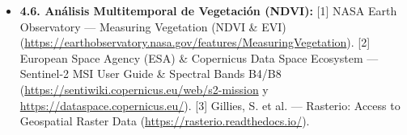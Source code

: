 \documentclass[10pt,a4paper]{article}
\begin{document}
\begin{itemize}
[11] GEBCO Compilation Group (2026). GEBCO 2026 Grid.
[12] Kirpich, Z. P. (1940). Time of concentration of small agricultural watersheds. \emph{Civil Engineering}, 10(6), 362.
\item \textbf{4.6. Análisis Multitemporal de Vegetación (NDVI):}
[1] NASA Earth Observatory — Measuring Vegetation (NDVI \& EVI) (\url{https://earthobservatory.nasa.gov/features/MeasuringVegetation}).
[2] European Space Agency (ESA) \& Copernicus Data Space Ecosystem — Sentinel-2 MSI User Guide \& Spectral Bands B4/B8 (\url{https://sentiwiki.copernicus.eu/web/s2-mission} y \url{https://dataspace.copernicus.eu/}).
[3] Gillies, S. et al. — Rasterio: Access to Geospatial Raster Data (\url{https://rasterio.readthedocs.io/}).
\end{itemize}
\end{document}
